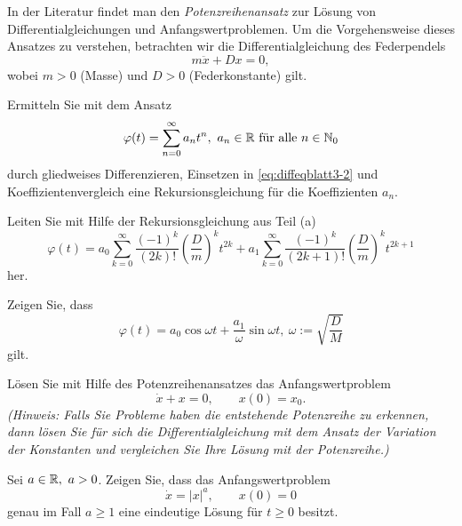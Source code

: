 \begin{Problem}
	In der Literatur findet man den \emph{Potenzreihenansatz} zur L\"{o}sung von Differentialgleichungen und Anfangswertproblemen. Um die Vorgehensweise dieses Ansatzes zu verstehen, betrachten wir die Differentialgleichung des Federpendels
	\begin{equation}\label{eq:diffeqblatt3-2}
		m\ddot{x}+Dx=0,
	\end{equation}
	wobei $m>0$ (Masse) und $D>0$ (Federkonstante) gilt.
	\begin{parts}
	\item Ermitteln Sie mit dem Ansatz
		\[
			\varphi(t)=\sum_{n=0}^{\infty} a_n t^n,~a_n\in \mathbb{R}~\text{f\"{u}r alle }n\in \mathbb{N}_0
		\] 
		durch gliedweises Differenzieren, Einsetzen in \eqref{eq:diffeqblatt3-2} und Koeffizientenvergleich eine Rekursionsgleichung f\"{u}r die Koeffizienten $a_n$.
	\item Leiten Sie mit Hilfe der Rekursionsgleichung aus Teil (a)
		\[
			\varphi(t)=a_0 \sum_{k=0}^{\infty} \frac{(-1)^k}{(2k)!}\left(\frac{D}{m}\right)^k t^{2k}+a_1 \sum_{k=0}^{\infty} \frac{(-1)^k}{(2k+1)!}\left( \frac{D}{m} \right)^k t^{2k+1}
		\]
		her.
	\item Zeigen Sie, dass
\[
\varphi(t)=a_0 \cos\omega t + \frac{a_1}{\omega}\sin \omega t,~\omega:=\sqrt{\frac{D}{M}} 
\]
gilt.
\item L\"{o}sen Sie mit Hilfe des Potenzreihenansatzes das Anfangswertproblem
	\[
		\dot{x}+x=0,\qquad x(0)=x_0
	.\] 
	\emph{(Hinweis: Falls Sie Probleme haben die entstehende Potenzreihe zu erkennen, dann lösen Sie für sich die Differentialgleichung mit dem Ansatz der Variation der Konstanten und vergleichen Sie Ihre Lösung mit der Potenzreihe.)} 
	\end{parts}
\end{Problem}

\begin{Problem}
	Sei $a\in \mathbb{R},~a>0$. Zeigen Sie, dass das Anfangswertproblem
	\[
		\dot{x}=|x|^a,\qquad x(0)=0
	\]
	genau im Fall $a\ge 1$ eine eindeutige L\"{o}sung f\"{u}r $t\ge 0$ besitzt.
\end{Problem}
